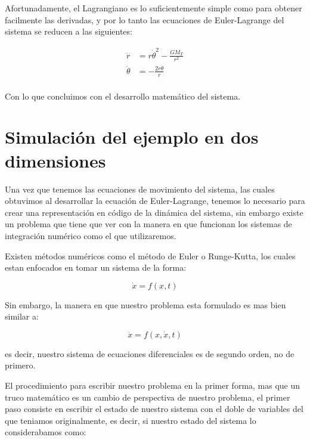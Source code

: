 \documentclass[11pt]{article}
\begin{document}
    Afortunadamente, el Lagrangiano es lo suficientemente simple como para
obtener facilmente las derivadas, y por lo tanto las ecuaciones de
Euler-Lagrange del sistema se reducen a las siguientes:

    \begin{align}
\ddot{r} &= r \dot{\theta}^2 - \frac{GM_T}{r^2} \\
\ddot{\theta} &= - \frac{2 \dot{r} \dot{\theta}}{r} \\
\end{align}

    Con lo que concluimos con el desarrollo matemático del sistema.

    \hypertarget{simulaciuxf3n-del-ejemplo-en-dos-dimensiones}{%
\section{Simulación del ejemplo en dos
dimensiones}\label{simulaciuxf3n-del-ejemplo-en-dos-dimensiones}}

    Una vez que tenemos las ecuaciones de movimiento del sistema, las cuales
obtuvimos al desarrollar la ecuación de Euler-Lagrange, tenemos lo
necesario para crear una representación en código de la dinámica del
sistema, sin embargo existe un problema que tiene que ver con la manera
en que funcionan los sistemas de integración numérico como el que
utilizaremos.

Existen métodos numéricos como el método de Euler o Runge-Kutta, los
cuales estan enfocados en tomar un sistema de la forma:

    \begin{equation}
\dot{x} = f(x, t)
\end{equation}

    Sin embargo, la manera en que nuestro problema esta formulado es mas
bien similar a:

    \begin{equation}
\ddot{x} = f(x, \dot{x}, t)
\end{equation}

    es decir, nuestro sistema de ecuaciones diferenciales es de segundo
orden, no de primero.

El procedimiento para escribir nuestro problema en la primer forma, mas
que un truco matemático es un cambio de perspectiva de nuestro problema,
el primer paso consiste en escribir el estado de nuestro sistema con el
doble de variables del que teniamos originalmente, es decir, si nuestro
estado del sistema lo considerabamos como:
\end{document}
